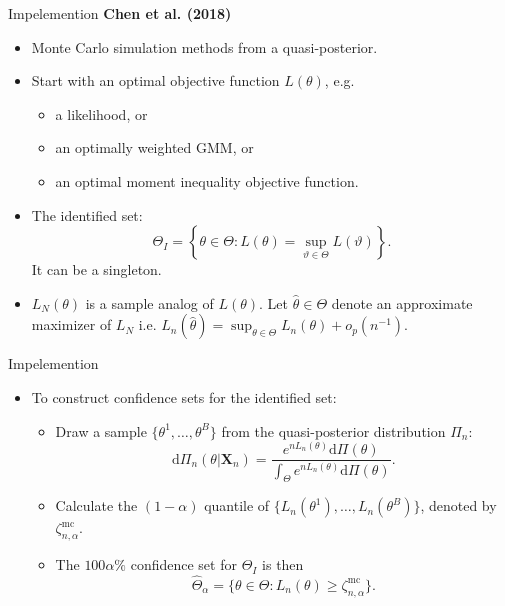 \documentclass[aspectratio=169]{beamer}  %
\begin{document}
\begin{frame}{Impelemention}
    \textbf{Chen et al. (2018)}
    \begin{itemize}
        \item Monte Carlo simulation methods from a quasi-posterior.
        \item Start with an optimal objective function $L(\theta)$, e.g. 
        \begin{itemize}
            \item a likelihood, or
            \item an optimally weighted GMM, or
            \item an optimal moment inequality objective function.
        \end{itemize}
        \item The identified set: $$\Theta_I=\left\{\theta\in\Theta:L(\theta)=\sup_{\vartheta\in\Theta}L(\vartheta)\right\}.$$
        It can be a singleton.
        \item $L_N(\theta)$ is a sample analog of $L(\theta)$. Let $\hat{\theta}\in\Theta$ denote an approximate maximizer of $L_N$ i.e. $L_n(\hat{\theta})=\sup_{\theta\in\Theta}L_n(\theta)+o_p(n^{-1})$.
        
    \end{itemize}
\end{frame}

\begin{frame}{Impelemention}
    \begin{itemize}
        \item To construct confidence sets for the identified set:
        \begin{itemize}
            \item Draw a sample $\{\theta^1,\ldots,\theta^B\}$ from the quasi-posterior distribution $\Pi_n$:
            $$\mathrm{d}\Pi_n(\theta|\mathbf{X}_n)=\frac{e^{nL_n(\theta)}\mathrm{d}\Pi(\theta)}{\int_\Theta e^{nL_n(\theta)}\mathrm{d}\Pi(\theta)}.$$
            \item Calculate the $(1-\alpha)$ quantile of $\{L_n(\theta^1),\ldots,L_n(\theta^B)\}$, denoted by $\zeta_{n,\alpha}^{\mathrm{mc}}$.
            \item The $100\alpha\%$ confidence set for $\Theta_I$ is then $$\hat{\Theta}_\alpha=\{\theta\in\Theta:L_n(\theta)\geq\zeta_{n,\alpha}^{\mathrm{mc}}\}.$$
        \end{itemize}
    \end{itemize}
\end{frame}
\end{document}
